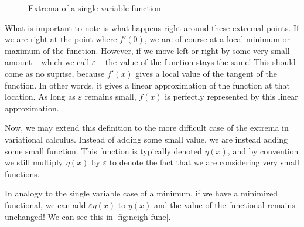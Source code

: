 \begin{figure}[ht]

    \caption{Extrema of a single variable function}
    \label{fig:single var func}
\end{figure}
What is important to note is what happens right around these extremal points. If we are right at the point where $f'(0)$, we are of course at a local minimum or maximum of the function. However, if we move left or right by some very small amount -- which we call $\varepsilon$ -- the value of the function stays the same! This should come as no suprise, because $f'(x)$ gives a local value of the tangent of the function. In other words, it gives a linear approximation of the function at that location. As long as $\varepsilon$ remains small, $f(x)$ is perfectly represented by this linear approximation.

Now, we may extend this definition to the more difficult case of the extrema in variational calculus. Instead of adding some small value, we are instead adding some small function. This function is typically denoted $\eta(x)$, and by convention we still multiply $\eta(x)$ by $\varepsilon$ to denote the fact that we are considering very small functions.

In analogy to the single variable case of a minimum, if we have a minimized functional, we can add $\varepsilon\eta(x)$ to $y(x)$ and the value of the functional remains unchanged! We can see this in \autoref{fig:neigh func}.

